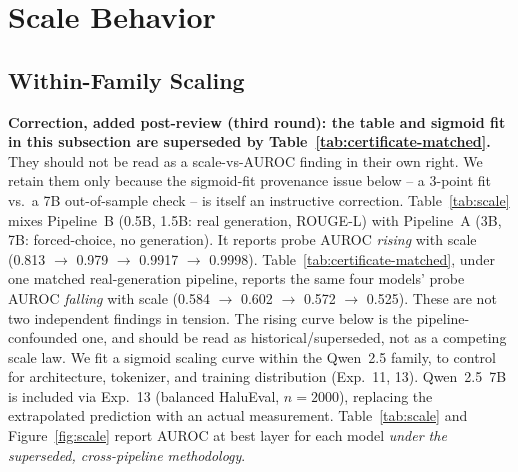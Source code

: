 \documentclass[10pt,twocolumn]{article}
\newcommand{\FloatBarrier}{\clearpage}
\begin{document}
\FloatBarrier
\section{Scale Behavior}
\label{sec:scale}

\subsection{Within-Family Scaling}
\label{sec:scale-curve}

\textbf{Correction, added post-review (third round): the table and
sigmoid fit in this subsection are superseded by
Table~\ref{tab:certificate-matched}.} They should not be read as a
scale-vs-AUROC finding in their own right. We retain them only because
the sigmoid-fit provenance issue below -- a 3-point fit vs.\ a 7B
out-of-sample check -- is itself an instructive correction.
Table~\ref{tab:scale} mixes Pipeline~B (0.5B, 1.5B: real generation,
ROUGE-L) with Pipeline~A (3B, 7B: forced-choice, no generation). It
reports probe AUROC \emph{rising} with scale (0.813 $\to$ 0.979 $\to$
0.9917 $\to$ 0.9998). Table~\ref{tab:certificate-matched}, under one
matched real-generation pipeline, reports the same four models' probe
AUROC \emph{falling} with scale (0.584 $\to$ 0.602 $\to$ 0.572 $\to$
0.525). These are not two independent findings in tension. The rising
curve below is the pipeline-confounded one, and should be read as
historical/superseded, not as a competing scale law. We fit a sigmoid
scaling curve within the Qwen~2.5 family, to control for architecture,
tokenizer, and training distribution (Exp.~11, 13). Qwen~2.5~7B is
included via Exp.~13 (balanced HaluEval, $n=2000$), replacing the
extrapolated prediction with an actual measurement. Table~\ref{tab:scale}
and Figure~\ref{fig:scale} report AUROC at best layer for each model
\emph{under the superseded, cross-pipeline methodology}.

\begin{table}[!htbp]
\centering
\caption{Qwen~2.5 family: best-layer probe AUROC vs.\ model scale
  (Exp.~11, 13; $n = 400$ controlled for 0.5B--3B; $n=2000$ for 7B).
  $^\ddagger$7B: Exp.~13 actual measurement, replacing the extrapolated
  prediction from Exp.~11.}
\label{tab:scale}
\small
\setlength{\tabcolsep}{5pt}
\end{table}
\end{document}

